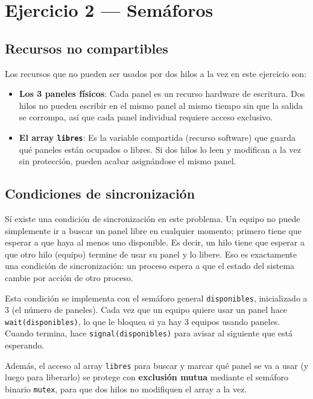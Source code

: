 \documentclass[12pt,a4paper]{article}
\begin{document}
\newpage

\section{Ejercicio 2 — Semáforos}

\subsection{Recursos no compartibles}

Los recursos que no pueden ser usados por dos hilos a la vez en este ejercicio son:
\begin{itemize}
  \item \textbf{Los 3 paneles físicos}: Cada panel es un recurso hardware de escritura. Dos hilos no pueden escribir en el mismo panel al mismo tiempo sin que la salida se corrompa, así que cada panel individual requiere acceso exclusivo.
  \item \textbf{El array \texttt{libres}}: Es la variable compartida (recurso software) que guarda qué paneles están ocupados o libres. Si dos hilos lo leen y modifican a la vez sin protección, pueden acabar asignándose el mismo panel.
\end{itemize}

\subsection{Condiciones de sincronización}

Sí existe una condición de sincronización en este problema. Un equipo no puede simplemente ir a buscar un panel libre en cualquier momento; primero tiene que esperar a que haya al menos uno disponible. Es decir, un hilo tiene que esperar a que otro hilo (equipo) termine de usar su panel y lo libere. Eso es exactamente una condición de sincronización: un proceso espera a que el estado del sistema cambie por acción de otro proceso.

Esta condición se implementa con el semáforo general \texttt{disponibles}, inicializado a 3 (el número de paneles). Cada vez que un equipo quiere usar un panel hace \texttt{wait(disponibles)}, lo que le bloquea si ya hay 3 equipos usando paneles. Cuando termina, hace \texttt{signal(disponibles)} para avisar al siguiente que está esperando.

Además, el acceso al array \texttt{libres} para buscar y marcar qué panel se va a usar (y luego para liberarlo) se protege con \textbf{exclusión mutua} mediante el semáforo binario \texttt{mutex}, para que dos hilos no modifiquen el array a la vez.
\end{document}
